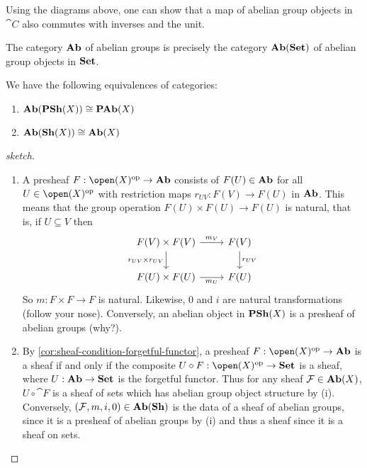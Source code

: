 \documentclass[../main.tex]{subfiles}
\begin{document}
Using the diagrams above, one can show that a map of abelian group objects in \(\cat C\) also commutes with inverses and the unit.

\begin{rmk}
The category \(\mathbf{Ab}\) of abelian groups is precisely the category \(\mathbf{Ab}(\mathbf{Set})\) of abelian group objects in \(\mathbf{Set}\).
\end{rmk}

\begin{lem} We have the following equivalences of categories:
    \begin{enumerate}
        \item $\mathbf{Ab}(\operatorname{\mathbf{PSh}}(X)) \cong \operatorname{\mathbf{PAb}}(X)$
        \item $\mathbf{Ab}(\operatorname{\mathbf{Sh}}(X)) \cong \operatorname{\mathbf{Ab}}(X)$
    \end{enumerate}
\end{lem}

\begin{proof}[sketch]
    \begin{enumerate}
        \item A presheaf $F\colon \open(X)\opp \to \catAbelianGroup$ consists of $F(U)\in\mathbf{Ab}$ for all $U\in \open(X)\opp$ with restriction maps $r_{UV}\colon F(V)\to F(U)$ in $\mathbf{Ab}$. This means that the group operation $F(U)\times F(U)\to F(U)$ is natural, that is, if $U\subseteq V$ then
        \[\begin{tikzcd}
        F(V)\times F(V) \arrow[r, "m_V"] \arrow[d, "r_{UV}\times r_{UV}"'] & F(V) \arrow[d, "r_{UV}"] \\
        F(U)\times F(U) \arrow[r, "m_U"']                                  & F(U)                    
        \end{tikzcd}\] So $m\colon F\times F\to F$ is natural. Likewise, $0$ and \(i\) are natural transformations (follow your nose). Conversely, an abelian object in $\operatorname{\mathbf{PSh}}(X)$ is a presheaf of abelian groups (why?).
        \item By \cref{cor:sheaf-condition-forgetful-functor}, a presheaf $F\colon \open(X)\opp\to \catAbelianGroup$ is a sheaf if and only if the composite $U\circ F\colon \open(X)\opp \to \catSet$ is a sheaf, where $U\colon \catAbelianGroup\to \catSet$ is the forgetful functor. Thus for any sheaf $\mathcal{F}\in \operatorname{\mathbf{Ab}}(X)$, $U\circ \cat F$ is a sheaf of sets which has abelian group object structure by (i). Conversely, $(\mathcal F, m,i, 0)\in \mathbf{Ab}(\operatorname{\mathbf{Sh}})$ is the data of a sheaf of abelian groups, since it is a presheaf of abelian groups by (i) and thus a sheaf since it is a sheaf on sets.  \qedhere
    \end{enumerate}\end{proof}
\end{document}
